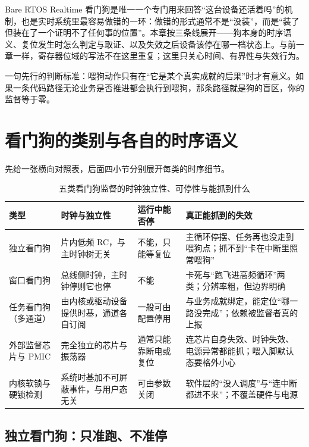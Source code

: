 \documentclass[12pt,a4paper,fontset=fandol]{ctexbook}
\newcommand{\Lang}[1]{\textsf{#1}}
\newcommand{\DomBare}{\Lang{Bare}}
\newcommand{\DomRtos}{\Lang{RTOS}}
\newcommand{\DomRT}{\Lang{Realtime}}
\begin{document}
\DomBare{} \DomRtos{} \DomRT{} 看门狗是唯一一个专门用来回答``这台设备还活着吗''的机制，也是实时系统里最容易做错的一环：做错的形式通常不是``没装''，而是``装了但装在了一个证明不了任何事的位置''。本章按三条线展开——狗本身的时序语义、复位发生时怎么判定与取证、以及失效之后设备该停在哪一档状态上。与前一章一样，寄存器位域的写法不在这里重复；这里只关心时间、有界性与失效行为。

一句先行的判断标准：喂狗动作只有在``它是某个真实成就的后果''时才有意义。如果一条代码路径无论业务是否推进都会执行到喂狗，那条路径就是狗的盲区，你的监督等于零。

\section{看门狗的类别与各自的时序语义}

先给一张横向对照表，后面四小节分别展开每类的时序细节。

\begin{table}[htbp]
\centering
\caption{五类看门狗监督的时钟独立性、可停性与能抓到什么}\label{tab:ch04-types}
\begin{tabular}{>{\raggedright\arraybackslash}p{} >{\raggedright\arraybackslash}p{} >{\raggedright\arraybackslash}p{} >{\raggedright\arraybackslash}p{}}
\toprule
类型 & 时钟与独立性 & 运行中能否停 & 真正能抓到的失效 \\
\midrule
独立看门狗 & 片内低频 RC，与主时钟树无关 & 不能，只能等复位 & 主循环停摆、任务再也没走到喂狗点；抓不到``卡在中断里照常喂狗'' \\
\addlinespace
窗口看门狗 & 总线侧时钟，主时钟停则它也停 & 不能 & 卡死与``跑飞进高频循环''两类；分辨率粗，但边界明确 \\
\addlinespace
任务看门狗（多通道） & 由内核或驱动设备提供时基，通道各自订阅 & 一般可由配置停用 & 与业务成就绑定，能定位``哪一路没完成''；依赖被监督者真的上报 \\
\addlinespace
外部监督芯片与 PMIC & 完全独立的芯片与振荡器 & 通常只能靠断电或复位 & 连芯片自身失效、时钟失效、电源异常都能抓；喂入脚默认态要格外小心 \\
\addlinespace
内核软锁与硬锁检测 & 系统时基加不可屏蔽事件，与用户态无关 & 可由参数关闭 & 软件层的``没人调度''与``连中断都进不来''；不覆盖硬件与电源 \\
\bottomrule
\end{tabular}
\end{table}

\subsection{独立看门狗：只准跑、不准停}
\end{document}
